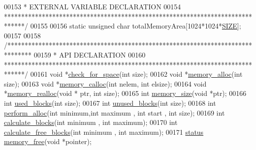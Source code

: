 \begin{DoxyCode}
{00153 \textcolor{comment}{ * EXTERNAL VARIABLE DECLARATION}
00154 \textcolor{comment}{ ******************************************************************************/}
00155 
00156 \textcolor{keyword}{static} \textcolor{keywordtype}{unsigned} \textcolor{keywordtype}{char} totalMemoryArea[1024*1024*\hyperlink{memory_management_8h_a70ed59adcb4159ac551058053e649640}{SIZE}];
00157 
00158 \textcolor{comment}{/*******************************************************************************}
00159 \textcolor{comment}{ * API DECLARATION}
00160 \textcolor{comment}{ ******************************************************************************/}
00161 \textcolor{keywordtype}{void} *\hyperlink{memory_management_8h_aea43d1dfada1be33a518865f1dfec034}{check\_for\_space}(\textcolor{keywordtype}{int} size);
00162 \textcolor{keywordtype}{void} *\hyperlink{memory_management_8h_ae30a35d507593a3635856b601305dd38}{memory\_alloc}(\textcolor{keywordtype}{int} size);  
00163 \textcolor{keywordtype}{void} *\hyperlink{memory_management_8h_a9fddae3713297adcee22fae422fe4383}{memory\_calloc}(\textcolor{keywordtype}{int} nelem, \textcolor{keywordtype}{int} elsize);
00164 \textcolor{keywordtype}{void} *\hyperlink{memory_management_8h_aeae46c0f1bc40e0e3b469f40feefd8d0}{memory\_realloc}(\textcolor{keywordtype}{void} * ptr, \textcolor{keywordtype}{int} size);
00165 \textcolor{keywordtype}{int} \hyperlink{memory_management_8h_a3e2309af44a44009e20dea96b76a5f06}{memory\_size}(\textcolor{keywordtype}{void} *ptr);
00166 \textcolor{keywordtype}{int} \hyperlink{memory_management_8h_a8758c4e9207b46696939c497d7688b74}{used\_blocks}(\textcolor{keywordtype}{int} size);
00167 \textcolor{keywordtype}{int} \hyperlink{memory_management_8h_a84a886fa82e1e3db2ab9e16c3a3b1434}{unused\_blocks}(\textcolor{keywordtype}{int} size);
00168 \textcolor{keywordtype}{int} \hyperlink{memory_management_8h_aaa1cfd5c78cb649d31cdcf5056523f9c}{perform\_alloc}(\textcolor{keywordtype}{int} minimum,\textcolor{keywordtype}{int} maximum , \textcolor{keywordtype}{int} start , \textcolor{keywordtype}{int} size);
00169 \textcolor{keywordtype}{int} \hyperlink{memory_management_8h_ab62a2cbf81f6577db0668f46aed364ef}{calculate\_blocks}(\textcolor{keywordtype}{int} minimum , \textcolor{keywordtype}{int} maximum);
00170 \textcolor{keywordtype}{int} \hyperlink{memory_management_8h_a156fe06c8c22c3783995e8c2ea0621b9}{calculate\_free\_blocks}(\textcolor{keywordtype}{int} minimum , \textcolor{keywordtype}{int} maximum);
00171 \hyperlink{memory_management_8h_a015eb90e0de9f16e87bd149d4b9ce959}{status} \hyperlink{memory_management_8h_a8a12d29f1824bf7225965e8b35a0f3a8}{memory\_free}(\textcolor{keywordtype}{void} *pointer);
}
\end{DoxyCode}
